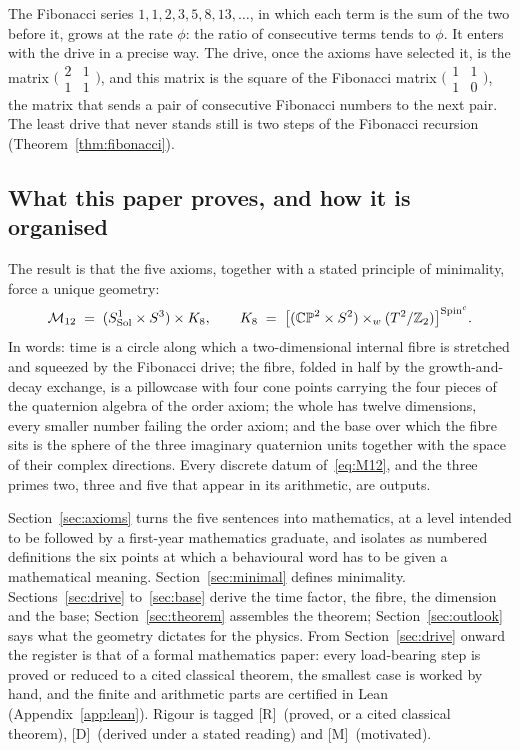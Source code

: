 \documentclass[11pt,a4paper]{article}
\theoremstyle{plain}
\theoremstyle{definition}
\theoremstyle{remark}
\newcommand{\Sol}{\mathrm{Sol}}
\newcommand{\rigR}{[\textup{R}]}
\newcommand{\rigD}{[\textup{D}]}
\newcommand{\rigM}{[\textup{M}]}
\begin{document}
The Fibonacci series $1,1,2,3,5,8,13,\dots$, in which each term is the sum of the two before it, grows at the rate $\phi$: the ratio of consecutive terms tends to $\phi$. It enters with the drive in a precise way. The drive, once the axioms have selected it, is the matrix $\bigl(\begin{smallmatrix}2&1\\1&1\end{smallmatrix}\bigr)$, and this matrix is the square of the Fibonacci matrix $\bigl(\begin{smallmatrix}1&1\\1&0\end{smallmatrix}\bigr)$, the matrix that sends a pair of consecutive Fibonacci numbers to the next pair. The least drive that never stands still is two steps of the Fibonacci recursion (Theorem~\ref{thm:fibonacci}).

\subsection{What this paper proves, and how it is organised}\label{sec:results}

The result is that the five axioms, together with a stated principle of minimality, force a unique geometry:
\begin{equation}\label{eq:M12}
\Mtwelve \;=\; (S^{1}_{\Sol}\times S^{3})\times\Keight, \qquad
\Keight \;=\; \bigl[(\CPtwo\times\Stwo)\times_{w}(\Ttwo/\Ztwo)\bigr]^{\Spinc}.
\end{equation}
In words: time is a circle along which a two-dimensional internal fibre is stretched and squeezed by the Fibonacci drive; the fibre, folded in half by the growth-and-decay exchange, is a pillowcase with four cone points carrying the four pieces of the quaternion algebra of the order axiom; the whole has twelve dimensions, every smaller number failing the order axiom; and the base over which the fibre sits is the sphere of the three imaginary quaternion units together with the space of their complex directions. Every discrete datum of~\eqref{eq:M12}, and the three primes two, three and five that appear in its arithmetic, are outputs.

Section~\ref{sec:axioms} turns the five sentences into mathematics, at a level intended to be followed by a first-year mathematics graduate, and isolates as numbered definitions the six points at which a behavioural word has to be given a mathematical meaning. Section~\ref{sec:minimal} defines minimality. Sections~\ref{sec:drive} to~\ref{sec:base} derive the time factor, the fibre, the dimension and the base; Section~\ref{sec:theorem} assembles the theorem; Section~\ref{sec:outlook} says what the geometry dictates for the physics. From Section~\ref{sec:drive} onward the register is that of a formal mathematics paper: every load-bearing step is proved or reduced to a cited classical theorem, the smallest case is worked by hand, and the finite and arithmetic parts are certified in Lean (Appendix~\ref{app:lean}). Rigour is tagged \rigR\ (proved, or a cited classical theorem), \rigD\ (derived under a stated reading) and \rigM\ (motivated).
\end{document}
